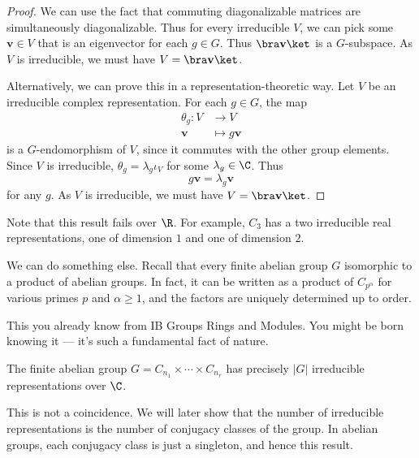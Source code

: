 \documentclass[a4paper]{article}
\begin{document}
\begin{proof}
  We can use the fact that commuting diagonalizable matrices are simultaneously diagonalizable. Thus for every irreducible $V$, we can pick some $\mathbf{v} \in V$ that is an eigenvector for each $g \in G$. Thus $\bra \mathbf{v}\ket$ is a $G$-subspace. As $V$ is irreducible, we must have $V = \bra \mathbf{v}\ket$.

  Alternatively, we can prove this in a representation-theoretic way. Let $V$ be an irreducible complex representation. For each $g \in G$, the map
  \begin{align*}
    \theta_g: V &\to V\\
    \mathbf{v} &\mapsto g\mathbf{v}
  \end{align*}
  is a $G$-endomorphism of $V$, since it commutes with the other group elements. Since $V$ is irreducible, $\theta_g = \lambda_g \iota_V$ for some $\lambda_g \in \C$. Thus
  \[
    g\mathbf{v} = \lambda_g \mathbf{v}
  \]
  for any $g$. As $V$ is irreducible, we must have $V = \bra \mathbf{v}\ket$.
\end{proof}
Note that this result fails over $\R$. For example, $C_3$ has a two irreducible real representations, one of dimension $1$ and one of dimension $2$.

We can do something else. Recall that every finite abelian group $G$ isomorphic to a product of abelian groups. In fact, it can be written as a product of $C_{p^\alpha}$ for various primes $p$ and $\alpha \geq 1$, and the factors are uniquely determined up to order.

This you already know from IB Groups Rings and Modules. You might be born knowing it --- it's such a fundamental fact of nature.

\begin{prop}
  The finite abelian group $G = C_{n_1} \times \cdots \times C_{n_r}$ has precisely $|G|$ irreducible representations over $\C$.
\end{prop}
This is not a coincidence. We will later show that the number of irreducible representations is the number of conjugacy classes of the group. In abelian groups, each conjugacy class is just a singleton, and hence this result.
\end{document}
